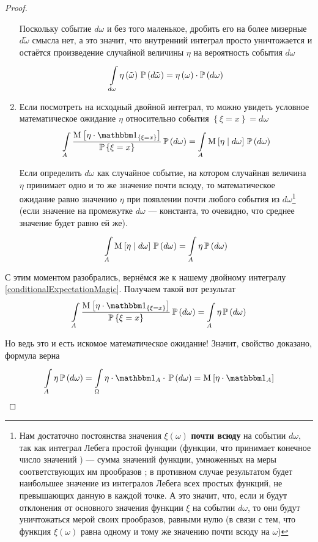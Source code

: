 \begin{proof}
\begin{enumerate}[label=\bfseries Формулировка \arabic*:]
        Поскольку событие $d\omega$ и без того маленькое,
        дробить его на более мизерные $d\tilde{\omega}$ смысла нет,
        а это значит, что внутренний интеграл просто уничтожается
        и остаётся произведение случайной величины $\eta$
        на вероятность события $d\omega$
        $$\integrall{d\omega}{\probability{d\tilde{\omega}}}{
            \eta\left( \tilde{\omega} \right)}
            = \eta\left( \omega \right) \cdot \probability{d\omega}$$
    \item
        Если посмотреть на исходный двойной интеграл,
        то можно увидеть условное математическое ожидание $\eta$
        относительно события $\left\{ \xi = x \right\}=d\omega$
        $$\integrall{A}{\probability{d\omega}}{
            \frac{\Mean{\eta \cdot \Indicatorof{\xi = x}}}
                    {\Probability{\xi = x}}}
            = \integrall{A}{\probability{d\omega}}{\Mean{\eta \mcond d\omega}}$$

        Если определить $d\omega$ как случайное событие,
        на котором случайная величина $\eta$ принимает
        одно и то же значение почти всюду,
        то математическое ожидание равно значению $\eta$
        при появлении почти любого события из $d\omega$\footnote{Нам достаточно
        постоянства значения $\xi\left( \omega \right)$ \textbf{почти всюду}
        на событии $d\omega$,
        так как интеграл Лебега простой функции (функции,
        что принимает конечное число значений \cite[стр.~53]{DorogovtsevIT})
        --- сумма значений функции, умноженных на меры
        соответствующих им прообразов \cite[стр.~69]{DorogovtsevIT};
        в противном случае результатом будет наибольшее значение
        из интегралов Лебега всех простых функций,
        не превышающих данную в каждой точке.
        А это значит, что, если и будут отклонения от основного значения функции
        $\xi$ на событии $d\omega$,
        то они будут уничтожаться мерой своих прообразов, равными нулю
        (в связи с тем, что функция $\xi\left( \omega \right)$
        равна одному и тому же значению почти всюду на $\omega$)
        }
        (если значение на промежутке $d\omega$ --- константа,
        то очевидно, что среднее значение будет равно ей же).
        $$\integrall{A}{\probability{d\omega}}{\Mean{\eta \mcond d\omega}}
            = \integrall{A}{\probability{d\omega}}{\eta}$$
\end{enumerate}

С этим моментом разобрались, вернёмся же к нашему двойному интегралу
\eqref{conditionalExpectationMagic}.
Получаем такой вот результат
$$\integrall{A}{\probability{d\omega}}{
    \frac{\Mean{\eta \cdot \Indicatorof{\xi = x}}}
        {\Probability{\xi = x}}}
    = \integrall{A}{\probability{d\omega}}{\eta}$$

Но ведь это и есть искомое математическое ожидание!
Значит, свойство доказано, формула верна
$$\integrall{A}{\probability{d\omega}}{\eta}
    = \integrall{\Omega}{\probability{d\omega}}{
        \eta \cdot \indicatorof{A} \cdot}
    = \Mean{ \eta \cdot \indicatorof{A} }$$
\end{proof}

